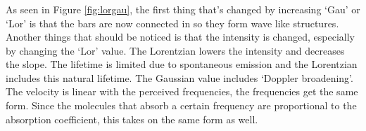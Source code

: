 \subsubsection{}
As seen in Figure \ref{fig:lorgau}, the first thing that's changed by increasing `Gau' or `Lor' is that the bars are now connected in so they form wave like structures. Another things that should be noticed is that the intensity is changed, especially by changing the `Lor' value. The Lorentzian lowers the intensity and decreases the slope. The lifetime is limited due to spontaneous emission and the Lorentzian includes this natural lifetime. The Gaussian value includes `Doppler broadening'. The velocity is linear with the perceived frequencies, the frequencies get the same form. Since the molecules that absorb a certain frequency are proportional to the absorption coefficient, this takes on the same form as well.
